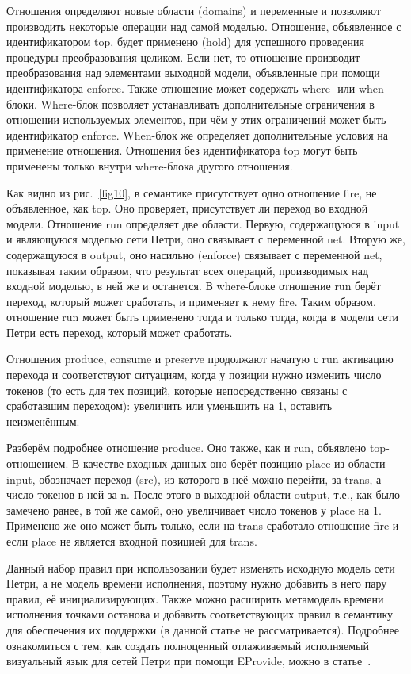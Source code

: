 \documentclass[a5paper]{article}
\begin{document}
Отношения определяют новые области (domains) и переменные и позволяют производить некоторые операции над самой моделью. Отношение, объявленное с идентификатором top, будет применено (hold) для успешного проведения процедуры преобразования целиком. Если нет, то отношение производит преобразования над элементами выходной модели, объявленные при помощи идентификатора enforce. Также отношение может содержать where- или when- блоки.  Where-блок позволяет устанавливать дополнительные ограничения в отношении используемых элементов, при чём у этих ограничений может быть идентификатор enforce. When-блок же определяет дополнительные условия на применение отношения. Отношения без идентификатора top могут быть применены только внутри where-блока другого отношения.

Как видно из рис.~\ref{fig10}, в семантике присутствует одно отношение fire, не объявленное, как top. Оно проверяет, присутствует ли переход во входной модели. Отношение run определяет две области. Первую, содержащуюся в input и являющуюся моделью сети Петри, оно связывает с переменной net. Вторую же, содержащуюся в output, оно насильно (enforce) связывает с переменной net, показывая таким образом, что результат всех операций, производимых над входной моделью, в ней же и останется. В where-блоке отношение run берёт переход, который может сработать, и применяет к нему fire. Таким образом, отношение run может быть применено тогда и только тогда, когда в модели сети Петри есть переход, который может сработать.

Отношения produce, consume и preserve продолжают начатую с run активацию перехода и соответствуют ситуациям, когда у позиции нужно изменить число токенов (то есть для тех позиций, которые непосредственно связаны с сработавшим переходом): увеличить или уменьшить на 1, оставить неизменённым.

Разберём подробнее отношение produce. Оно также, как и run, объявлено top-отношением. В качестве входных данных оно берёт позицию place из области input, обозначает переход (src), из которого в неё можно перейти, за trans, а число токенов в ней за n. После этого в выходной области output, т.е., как было замечено ранее, в той же самой, оно увеличивает число токенов у place на 1. Применено же оно может быть только, если на trans сработало отношение fire и если place не является входной позицией для trans.

Данный набор правил при использовании будет изменять исходную модель сети Петри, а не модель времени исполнения, поэтому нужно добавить в него пару правил, её инициализирующих. Также можно расширить метамодель времени исполнения точками останова и добавить соответствующих правил в семантику для обеспечения их поддержки (в данной статье не рассматривается). Подробнее ознакомиться с тем, как создать полноценный отлаживаемый исполняемый визуальный язык для сетей Петри при помощи EProvide, можно в статье~\cite{wachsmuth1}.
\end{document}
